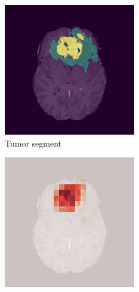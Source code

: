 \begin{figure}[H]
\begin{subfigure}[t]{.45\textwidth}
        \includegraphics[width=\linewidth]{chapters/06_hdm/book/1.png}
        \caption{Tumor segment}
    \end{subfigure}
    \begin{subfigure}[t]{.45\textwidth}
        \centering
        \includegraphics[width=\linewidth]{chapters/06_hdm/book/2.png}

\end{subfigure}
\end{figure}
